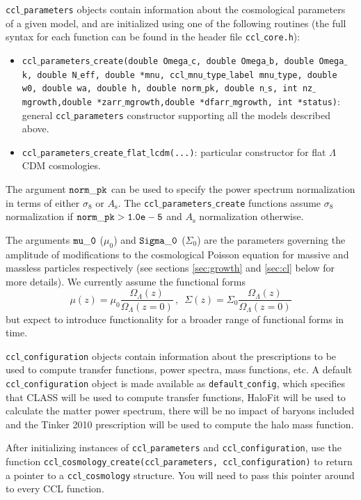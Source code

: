 \documentclass[\docopts]{\docclass}
\begin{document}
{\tt ccl$\_$parameters} objects contain information about the cosmological parameters of a given model, and are initialized using one of the following routines (the full syntax for each function can be found in the header file {\tt ccl$\_$core.h}):
\begin{itemize}
 \item {\tt ccl$\_$parameters$\_$create(double Omega$\_$c, double Omega$\_$b, double Omega$\_$k, double N$\_$eff, double *mnu, ccl$\_$mnu$\_$type$\_$label mnu$\_$type, double w0, double wa, double h, double norm$\_$pk, double n$\_$s, int nz$\_$mgrowth,double *zarr$\_$mgrowth,double *dfarr$\_$mgrowth, int *status)}: general {\tt ccl$\_$parameters} constructor supporting all the models described above.
 \item {\tt ccl$\_$parameters$\_$create$\_$flat$\_$lcdm(...)}: particular constructor for flat $\Lambda$CDM cosmologies.
 \end{itemize}
The argument ${\tt norm\_pk}$ can be used to specify the power spectrum normalization in terms of either $\sigma_8$ or $A_\mathrm{s}$. The {\tt ccl$\_$parameters$\_$create} functions assume $\sigma_8$ normalization if ${\tt norm\_pk > 1.0e-5}$ and $A_{\mathrm s}$ normalization otherwise.

The arguments ${\tt mu\_0}$ ($\mu_0$) and ${\tt Sigma\_0}$ ($\Sigma_0$) are the parameters governing the amplitude of modifications to the cosmological Poisson equation for massive and massless particles respectively (see sections \ref{sec:growth} and \ref{sec:cl} below for more details). We currently assume the functional forms \citep{Ferreira2010}
\begin{equation}
\mu(z) = \mu_0 \frac{\Omega_\Lambda(z)}{\Omega_\Lambda(z=0)}\, , \,\,\, \Sigma(z) = \Sigma_0 \frac{\Omega_\Lambda(z)}{\Omega_\Lambda(z=0)}
\label{muSigform}
\end{equation}
but expect to introduce functionality for a broader range of functional forms in time.

{\tt ccl$\_$configuration} objects contain information about the prescriptions to be used to compute transfer functions, power spectra, mass functions, etc. A default {\tt ccl$\_$configuration} object is made available as {\tt default$\_$config}, which specifies that CLASS will be used to compute transfer functions, HaloFit will be used to calculate the matter power spectrum, there will be no impact of baryons included and the Tinker 2010 prescription will be used to compute the halo mass function.

After initializing instances of {\tt ccl$\_$parameters} and {\tt ccl$\_$configuration}, use the function {\tt ccl$\_$cosmology$\_$create(ccl$\_$parameters, ccl$\_$configuration)} to return a pointer to a {\tt ccl$\_$cosmology} structure. You will need to pass this pointer around to every CCL function.
\end{document}
